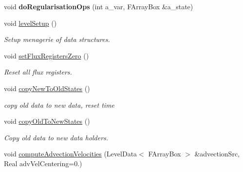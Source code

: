 \begin{DoxyCompactItemize}
\item 
\hypertarget{class_a_m_r_level_mushy_layer_a0efd6693e4a91d5df4284c4b8570cb24}{void {\bfseries do\-Regularisation\-Ops} (int a\-\_\-var, F\-Array\-Box \&a\-\_\-state)}\label{class_a_m_r_level_mushy_layer_a0efd6693e4a91d5df4284c4b8570cb24}

\item 
\hypertarget{class_a_m_r_level_mushy_layer_a914c405e621143eed2da6da1bcae2604}{void \hyperlink{class_a_m_r_level_mushy_layer_a914c405e621143eed2da6da1bcae2604}{level\-Setup} ()}\label{class_a_m_r_level_mushy_layer_a914c405e621143eed2da6da1bcae2604}

\begin{DoxyCompactList}\small\item\em Setup menagerie of data structures. \end{DoxyCompactList}\item 
\hypertarget{class_a_m_r_level_mushy_layer_ae7241de9407e8d6a7ad84166d5cc24fc}{void \hyperlink{class_a_m_r_level_mushy_layer_ae7241de9407e8d6a7ad84166d5cc24fc}{set\-Flux\-Registers\-Zero} ()}\label{class_a_m_r_level_mushy_layer_ae7241de9407e8d6a7ad84166d5cc24fc}

\begin{DoxyCompactList}\small\item\em Reset all flux registers. \end{DoxyCompactList}\item 
void \hyperlink{class_a_m_r_level_mushy_layer_ad0fbde13c159047cbc2cfd3e3eb83eb0}{copy\-New\-To\-Old\-States} ()
\begin{DoxyCompactList}\small\item\em copy old data to new data, reset time \end{DoxyCompactList}\item 
\hypertarget{class_a_m_r_level_mushy_layer_a4223e19add7010f40fa97c297313af35}{void \hyperlink{class_a_m_r_level_mushy_layer_a4223e19add7010f40fa97c297313af35}{copy\-Old\-To\-New\-States} ()}\label{class_a_m_r_level_mushy_layer_a4223e19add7010f40fa97c297313af35}

\begin{DoxyCompactList}\small\item\em Copy old data to new data holders. \end{DoxyCompactList}\item 
\hypertarget{class_a_m_r_level_mushy_layer_a6eb2873a405edcb7f9ae01f6ba28fe44}{void \hyperlink{class_a_m_r_level_mushy_layer_a6eb2873a405edcb7f9ae01f6ba28fe44}{compute\-Advection\-Velocities} (Level\-Data$<$ F\-Array\-Box $>$ \&advection\-Src, Real adv\-Vel\-Centering=0.)}\label{class_a_m_r_level_mushy_layer_a6eb2873a405edcb7f9ae01f6ba28fe44}


\end{DoxyCompactItemize}
